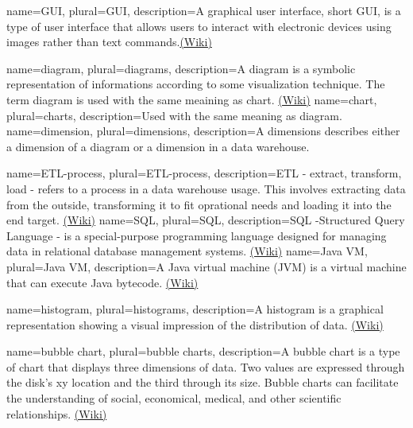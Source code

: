{
  name=GUI,
  plural=GUI,
  description={A graphical user interface, short GUI, is a type of user interface 
  that allows users to interact with electronic devices using images rather 
  than text commands.\href{https://en.wikipedia.org/wiki/Graphical_user_interface}{(Wiki)}}
}

{
  name=diagram,
  plural=diagrams,
  description={A diagram is a symbolic representation of informations according to some
  visualization technique. The term diagram is used with the same meaining as \gls{chart}.
  \href{https://en.wikipedia.org/wiki/Diagram}{(Wiki)}}
}
{
  name=chart,
  plural=charts,
  description={Used with the same meaning as \gls{diagram}.}
}
{
  name=dimension,
  plural=dimensions,
  description={A dimensions describes either a dimension of a \gls{diagram} or a dimension in a
  \gls{data warehouse}.  }
}

{
  name=ETL-process,
  plural=ETL-process,
  description={ETL - extract, transform, load - refers to a process in a \gls{data warehouse} usage. This involves
  extracting data from the outside, transforming it to fit oprational needs and loading it into the end target.
 \href{https://de.wikipedia.org/wiki/ETL-Prozess}{(Wiki)}}
}
{
  name=SQL,
  plural=SQL,
  description={SQL -Structured Query Language - is a special-purpose programming language designed for 
  managing data in relational \gls{database} management systems. \href{https://en.wikipedia.org/wiki/Sql}{(Wiki)}}
}
{
  name=Java VM,
  plural=Java VM,
  description={A Java virtual machine (JVM) is a virtual machine that can execute Java bytecode. 
  \href{https://en.wikipedia.org/wiki/Java_virtual_machine}{(Wiki)}}
}

{
  name=histogram,
  plural=histograms,
  description={A histogram is a graphical representation showing a visual impression of the distribution of data. 
   \href{http://en.wikipedia.org/wiki/Histogram}{(Wiki)}}
}

{
  name=bubble chart,
  plural=bubble charts,
  description={A bubble chart is a type of chart that displays three 
  dimensions of data. Two values are expressed through the disk's xy location and the third 
  through its size. Bubble charts can facilitate the understanding of social,
economical, medical, and other scientific relationships. \href{http://en.wikipedia.org/wiki/Bubble_chart}{(Wiki)}}
}

